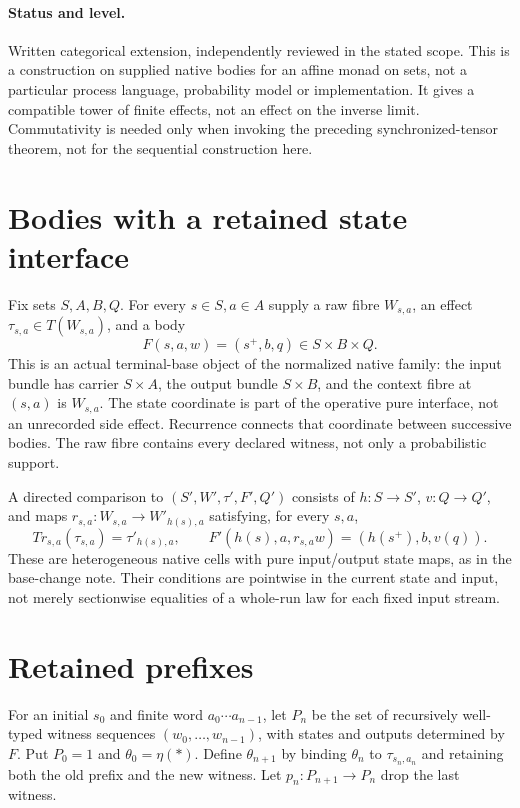 \documentclass[11pt]{article}
\begin{document}
\paragraph{Status and level.} Written categorical extension, independently reviewed in the stated scope. This is a construction on supplied native bodies for an affine monad on sets, not a particular process language, probability model or implementation. It gives a compatible tower of finite effects, not an effect on the inverse limit. Commutativity is needed only when invoking the preceding synchronized-tensor theorem, not for the sequential construction here.

\section{Bodies with a retained state interface}
Fix sets $S,A,B,Q$. For every $s\in S,a\in A$ supply a raw fibre $W_{s,a}$, an effect $\tau_{s,a}\in T(W_{s,a})$, and a body
\[
 F(s,a,w)=(s^+,b,q)\in S\times B\times Q.
\]
This is an actual terminal-base object of the normalized native family: the input bundle has carrier $S\times A$, the output bundle $S\times B$, and the context fibre at $(s,a)$ is $W_{s,a}$. The state coordinate is part of the operative pure interface, not an unrecorded side effect. Recurrence connects that coordinate between successive bodies. The raw fibre contains every declared witness, not only a probabilistic support.

A directed comparison to $(S',W',\tau',F',Q')$ consists of $h:S\to S'$, $v:Q\to Q'$, and maps $r_{s,a}:W_{s,a}\to W'_{h(s),a}$ satisfying, for every $s,a$,
\[
 T r_{s,a}(\tau_{s,a})=\tau'_{h(s),a},\qquad
 F'(h(s),a,r_{s,a}w)=(h(s^+),b,v(q)).\tag{N}
\]
These are heterogeneous native cells with pure input/output state maps, as in the base-change note. Their conditions are pointwise in the current state and input, not merely sectionwise equalities of a whole-run law for each fixed input stream.

\section{Retained prefixes}
For an initial $s_0$ and finite word $a_0\cdots a_{n-1}$, let $P_n$ be the set of recursively well-typed witness sequences $(w_0,\ldots,w_{n-1})$, with states and outputs determined by $F$. Put $P_0=1$ and $\theta_0=\eta(*)$. Define $\theta_{n+1}$ by binding $\theta_n$ to $\tau_{s_n,a_n}$ and retaining both the old prefix and the new witness. Let $p_n:P_{n+1}\to P_n$ drop the last witness.
\end{document}
